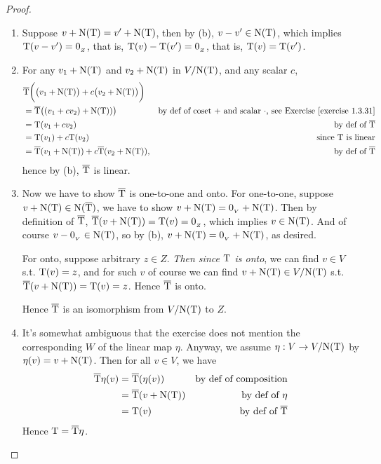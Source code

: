 \begin{proof} \ 

\begin{enumerate}
\item Suppose \(v + \mathrm{N(T)} = v' + \mathrm{N(T)}\), then by (b), \(v - v' \in \mathrm{N(T)}\), which implies \(\mathrm{T}(v - v') = 0_{_Z}\), that is, \(\mathrm{T}(v) - \mathrm{T}(v') = 0_{_Z}\), that is, \(\mathrm{T}(v) = \mathrm{T}(v')\).

\item For any \(v_1 + \mathrm{N(T)}\) and \(v_2 + \mathrm{N(T)}\) in \(V/\mathrm{N(T)}\), and any scalar \(c\),
\begin{align*}
    & \overline{\T}\bigg( \big( v_1 + \NULLT \big) + c \big(v_2 + \NULLT \big)  \bigg) \\
    & = \overline{\T}\big( (v_1 + cv_2) + \NULLT) \big) & \text{by def of coset \(+\) and scalar \(\cdot\), see \EXEC{1.3.31}} \\
    & = \T(v_1 + cv_2) & \text{by def of \(\overline{\T}\)} \\
    & = \T(v_1) + c\T(v_2) & \text{since \(\T\) is linear} \\
    & = \overline{\T}(v_1 + \NULLT) + c\overline{\T}(v_2 + \NULLT), & \text{by def of \(\overline{\T}\)}
\end{align*}
hence by (b), \(\overline{\mathrm{T}}\) is linear.

\item Now we have to show \(\overline{\mathrm{T}}\) is one-to-one and onto.
For one-to-one, suppose \(v + \mathrm{N(T)} \in \mathrm{N}(\overline{\mathrm{T}})\), we have to show \(v + \mathrm{N(T)} = 0_{_V} + \mathrm{N(T)}\).
Then by definition of \(\overline{\mathrm{T}}\), \(\overline{\mathrm{T}}(v + \mathrm{N(T)}) = \mathrm{T}(v) = 0_{_Z}\), which implies \(v \in \mathrm{N(T)}\).
And of course \(v - 0_{_V} \in \mathrm{N(T)}\), so by (b), \(v + \mathrm{N(T)} = 0_{_V} + \mathrm{N(T)}\), as desired.

For onto, suppose arbitrary \(z \in Z\).
\emph{Then since \(\mathrm{T}\) is onto}, we can find \(v \in V\) s.t. \(\mathrm{T}(v) = z\), and for such \(v\) of course we can find \(v + \mathrm{N(T)} \in V/\mathrm{N(T)}\) s.t. \(\overline{\mathrm{T}}(v + \mathrm{N(T)}) = \mathrm{T}(v) = z\).
Hence \(\overline{\mathrm{T}}\) is onto.

Hence \(\overline{\mathrm{T}}\) is an isomorphism from \(V/\mathrm{N(T)}\) to \(Z\).

\item It's somewhat ambiguous that the exercise does not mention the corresponding \(W\) of the linear map \(\eta\).
Anyway, we assume \(\eta : V \to V/\mathrm{N(T)}\) by \(\eta(v) = v + \mathrm{N(T)}\).
Then for all \(v \in V\), we have
\begin{align*}
    \overline{\mathrm{T}}\eta(v) & = \overline{\mathrm{T}}(\eta(v)) & \text{by def of composition} \\
                         & = \overline{\mathrm{T}}(v + \mathrm{N(T)}) & \text{by def of \(\eta\)} \\
                         & = \mathrm{T}(v) & \text{by def of \(\overline{\mathrm{T}}\)}
\end{align*}
Hence \(\mathrm{T} = \overline{\mathrm{T}}\eta\).
\end{enumerate}
\end{proof}

